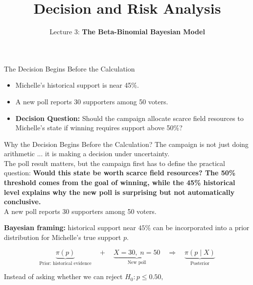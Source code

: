 \documentclass[aspectratio=43,11pt]{beamer}
\title{Decision and Risk Analysis}
\subtitle{Lecture 3: \textbf{The Beta-Binomial Bayesian Model}}
\author{\emph{}}
\date{\color{aggiemaroon}{
DAEN 427 / ISEN 427 / ISEN 627\\
\textbf{Alexander Abuabara}\\
Fall 2026
}}
\begin{document}
  \begin{frame}[plain]
    \titlepage
  \end{frame}

  {
    \begin{frame}{The Decision Begins Before the Calculation}
      \large
      \begin{itemize}
        \item Michelle's historical support is near 45\%.\\
        \item A new poll reports 30 supporters among 50 voters.\\
        \item {\bf Decision Question:} Should the campaign allocate scarce field resources to Michelle's state if winning requires support above 50\%?
      \end{itemize}
    \end{frame}
  
    \begin{frame}{Why the Decision Begins Before the Calculation?}
      \large
      \pause
      The campaign is not just doing arithmetic ... it is making a decision under uncertainty.\\
      
      The poll result matters, but the campaign first has to define the practical question: {\bf Would this state be worth scarce field resources? The 50\% threshold comes from the goal of winning, while the 45\% historical level explains why the new poll is surprising but not automatically conclusive.}\\
      
      A new poll reports 30 supporters among 50 voters.
    \end{frame}
    
    \begin{frame}{}
      \textbf{Bayesian framing:} historical support near \(45\%\) can be incorporated
      into a prior distribution for Michelle's true support \(p\).

      \[
      \underbrace{\pi(p)}_{\text{Prior: historical evidence}}
      \quad + \quad
      \underbrace{X=30,\; n=50}_{\text{New poll}}
      \quad \Longrightarrow \quad
      \underbrace{\pi(p\mid X)}_{\text{Posterior}}
      \]

      Instead of asking whether we can reject
      $
      H_0:p\leq 0.50,
      $


\end{frame}}
\end{document}
